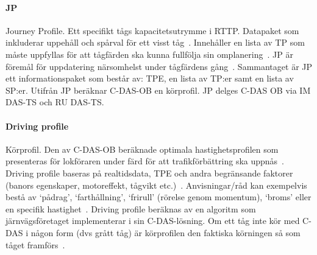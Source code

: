 \paragraph{JP}
Journey Profile.
Ett specifikt tågs kapacitetsutrymme i RTTP\@.
Datapaket som inkluderar uppehåll och spårval för ett visst tåg~\cite{Olsson2023}.
Innehåller en lista av TP som måste uppfyllas för att tågfärden ska kunna fullfölja sin omplanering~\cite{Olsson2023}.
JP är föremål för uppdatering närsomhelst under tågfärdens gång~\cite{Olsson2023}.
Sammantaget är JP ett informationspaket som består av: TPE, en lista av TP:er samt en lista av SP:er.
Utifrån JP beräknar C-DAS-OB en körprofil.
JP delges C-DAS OB via IM DAS-TS och RU DAS-TS\@.
\paragraph{Driving profile}
Körprofil.
Den av C-DAS-OB beräknade optimala hastighetsprofilen som presenteras för lokföraren under färd för att trafikförbättring ska uppnås~\cite{IRS90940}.
Driving profile baseras på realtidsdata, TPE och andra begränsande faktorer (banors egenskaper, motoreffekt, tågvikt etc.)~\cite{IRS90940}.
Anvisningar/råd kan exempelvis bestå av \lq{}pådrag\rq{}, \lq{}farthållning\rq{}, \lq{}frirull\rq{} (rörelse genom momentum), \lq{}broms\rq{} eller en specifik hastighet~\cite{IRS90940}.
Driving profile beräknas av en algoritm som järnvägsföretaget implementerar i sin C-DAS-lösning.
Om ett tåg inte kör med C-DAS i någon form (dvs grått tåg) är körprofilen den faktiska körningen så som tåget framförs~\cite{Olsson2023}.
